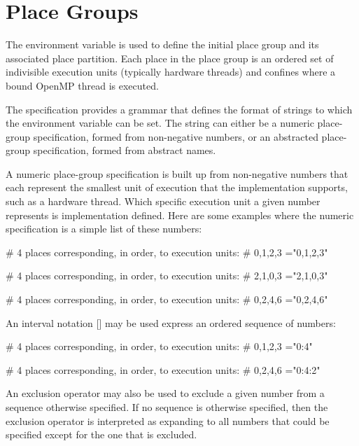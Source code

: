 \pagebreak

\section{Place Groups}
\label{sec: place_groups}

The  environment variable is used to define the initial place group
and its associated place partition. Each place in the place group is an ordered
set of indivisible execution units (typically hardware threads) and confines
where a bound OpenMP thread is executed.

The specification provides a grammar that defines the format of strings to which
the environment variable can be set. The string can either be a numeric
place-group specification, formed from non-negative numbers, or an abstracted
place-group specification, formed from abstract names.

A numeric place-group specification is built up from non-negative numbers that
each represent the smallest unit of execution that the implementation supports,
such as a hardware thread. Which specific execution unit a given number
represents is implementation defined. Here are some examples where the numeric
specification is a simple list of these numbers:

\begin{boxeducode}
# 4 places corresponding, in order, to execution units:
# 0,1,2,3
="0,1,2,3"

# 4 places corresponding, in order, to execution units:
# 2,1,0,3
="2,1,0,3"

# 4 places corresponding, in order, to execution units:
# 0,2,4,6
="0,2,4,6"
\end{boxeducode}

An interval notation
\code{:}[\code{:}] may be used
express an ordered sequence of numbers:

\begin{boxeducode}
# 4 places corresponding, in order, to execution units:
# 0,1,2,3
="0:4"

# 4 places corresponding, in order, to execution units:
# 0,2,4,6
="0:4:2"
\end{boxeducode}

An exclusion operator \code{!} may also be used to exclude a given number from a
sequence otherwise specified. If no sequence is otherwise specified, then the
exclusion operator is interpreted as expanding to all numbers that could be
specified except for the one that is excluded.

